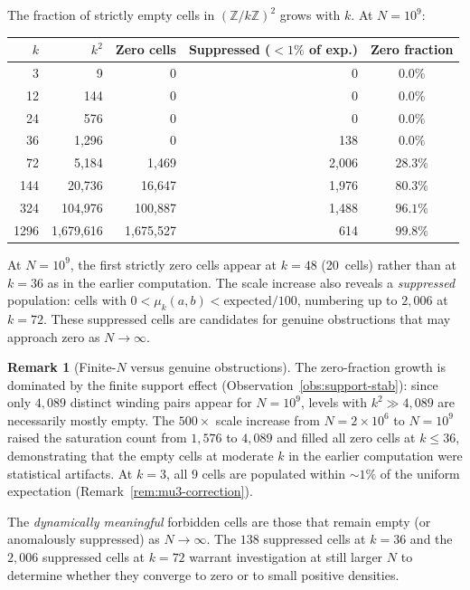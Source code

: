 \documentclass[11pt,a4paper]{article}
\newcommand{\Z}{\mathbb{Z}}
\theoremstyle{plain}
\theoremstyle{definition}
\newtheorem{remark}[theorem]{Remark}
\begin{document}
\begin{empirical}
\label{obs:forbidden}
    The fraction of strictly empty cells in $(\Z/k\Z)^2$ grows
    with $k$.  At $N = 10^9$:
    \begin{center}
    \renewcommand{\arraystretch}{1.15}
    \begin{tabular}{rrrrc}
        \toprule
        $k$ & $k^2$ & Zero cells & Suppressed ($<1\%$ of exp.)
            & Zero fraction \\
        \midrule
        3  & 9       & 0    & 0        & $0.0\%$ \\
        12 & 144     & 0    & 0        & $0.0\%$ \\
        24 & 576     & 0    & 0        & $0.0\%$ \\
        36 & 1{,}296    & 0     & 138   & $0.0\%$ \\
        72 & 5{,}184    & 1{,}469 & 2{,}006 & $28.3\%$ \\
        144 & 20{,}736  & 16{,}647 & 1{,}976 & $80.3\%$ \\
        324 & 104{,}976 & 100{,}887 & 1{,}488 & $96.1\%$ \\
        1296 & 1{,}679{,}616 & 1{,}675{,}527 & 614 & $99.8\%$ \\
        \bottomrule
    \end{tabular}
    \end{center}
    At $N = 10^9$, the first strictly zero cells appear at
    $k = 48$ (20~cells) rather than at $k = 36$ as in the earlier
    computation.  The scale increase also reveals a \emph{suppressed}
    population: cells with $0 < \mu_k(a,b) < \text{expected}/100$,
    numbering up to $2{,}006$ at $k = 72$.  These suppressed cells
    are candidates for genuine obstructions that may approach zero
    as $N \to \infty$.
\end{empirical}

\begin{remark}[Finite-$N$ versus genuine obstructions]
    The zero-fraction growth is dominated by the finite support effect
    (Observation~\ref{obs:support-stab}): since only $4{,}089$
    distinct winding pairs appear for $N = 10^9$, levels with
    $k^2 \gg 4{,}089$ are necessarily mostly empty.  The
    $500\times$ scale increase from $N = 2 \times 10^6$ to
    $N = 10^9$ raised the saturation count from $1{,}576$ to
    $4{,}089$ and filled all zero cells at $k \leq 36$, demonstrating
    that the empty cells at moderate $k$ in the earlier computation
    were statistical artifacts.  At $k = 3$, all $9$ cells are
    populated within ${\sim}1\%$ of the uniform expectation
    (Remark~\ref{rem:mu3-correction}).

    The \emph{dynamically meaningful} forbidden cells are those
    that remain empty (or anomalously suppressed) as $N \to \infty$.
    The $138$ suppressed cells at $k = 36$ and the $2{,}006$
    suppressed cells at $k = 72$ warrant investigation at still
    larger $N$ to determine whether they converge to zero or to
    small positive densities.
\end{remark}
\end{document}
